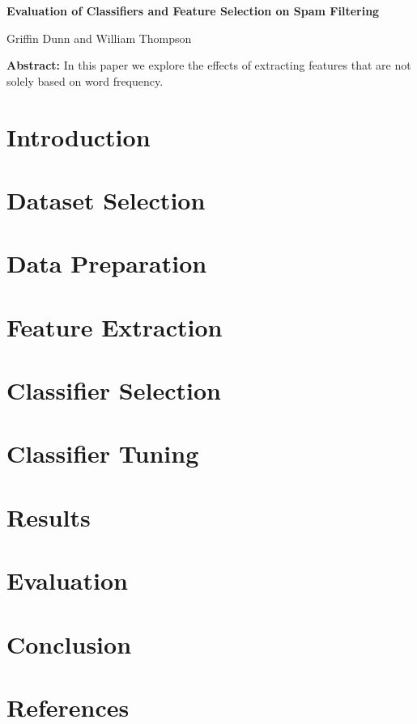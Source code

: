 \documentclass[12pt]{article}
\begin{document}
    \begin{center}
        \textbf{Evaluation of Classifiers and Feature Selection on Spam Filtering} 
    \end{center}

    \begin{center}
        Griffin Dunn and William Thompson
    \end{center}

    \textbf{Abstract:} 
        In this paper we explore the effects of extracting features that are not solely based on word frequency.

    \begin{multicols}{2}
        \section{Introduction}
            

        \section{Dataset Selection}

        \section{Data Preparation}

        \section{Feature Extraction}

        \section{Classifier Selection}

        \section{Classifier Tuning}

        \section{Results}

        \section{Evaluation}

        \section{Conclusion}

        \section{References}

    \end{multicols}
 
\end{document}
